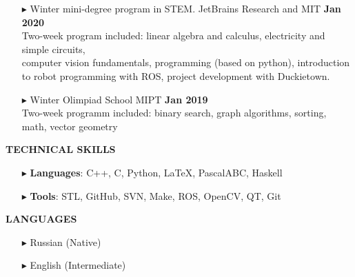 \documentclass[a4paper,10pt]{article}
\begin{document}
	\begin{itemize}
		\item[$\blacktriangleright$]  Winter mini-degree program in STEM. JetBrains Research and MIT \hspace{4.7cm}\textbf{Jan 2020} \\ 
		Two-week program included: linear algebra and calculus, electricity and simple circuits,\\ computer vision fundamentals, programming (based on python), introduction to robot programming with ROS, project development with Duckietown.
		\item[$\blacktriangleright$]  Winter Olimpiad School MIPT \hspace{10.4cm}\textbf{Jan 2019} \\ Two-week programm included: binary search, graph algorithms, sorting, math, vector geometry
	\end{itemize}
	
	
	
	\colorbox{magicmint}{
		\begin{minipage}{0.96\textwidth}
			\vphantom{.}
			\textbf{TECHNICAL SKILLS}
		\end{minipage}
	}
	\begin{itemize}
		\item [$\blacktriangleright$]  \textbf{Languages}: C++, C, Python, \LaTeX, PascalABC, Haskell
		\item [$\blacktriangleright$]  \textbf{Tools}: STL, GitHub, SVN, Make, ROS, OpenCV, QT, Git
	\end{itemize}
	 
	
	\colorbox{magicmint}{
		\begin{minipage}{0.96\textwidth}
			\vphantom{.}
			\textbf{LANGUAGES}
		\end{minipage}
	}
	\begin{itemize}
		\item[$\blacktriangleright$]  Russian (Native)
		\item[$\blacktriangleright$]  English (Intermediate)
	\end{itemize}
	
\end{document}
